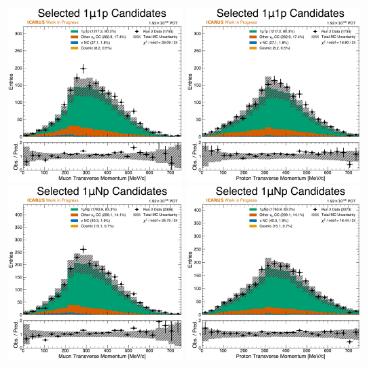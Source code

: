 \begin{figure}
    \centering
    \includegraphics[width=0.41\textwidth]{figures/data_mc_comparisons/datamc_hist1d_1mu1p_muon_pt.pdf}
    \includegraphics[width=0.41\textwidth]{figures/data_mc_comparisons/datamc_hist1d_1mu1p_proton_pt.pdf}
    \\
    \includegraphics[width=0.41\textwidth]{figures/data_mc_comparisons/datamc_hist1d_1muNp_muon_pt.pdf}
    \includegraphics[width=0.41\textwidth]{figures/data_mc_comparisons/datamc_hist1d_1muNp_proton_pt.pdf}

\end{figure}
